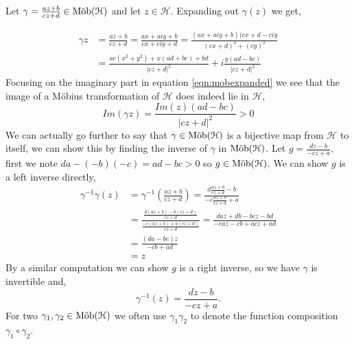 \begin{remark}\label{rem:mobiusExpandBiject}
Let $ \gamma = \frac{az + b}{cz +d} \in \text{M{\"o}b}(\mathcal{H})$ and let $z \in \mathcal{H}$. 
Expanding out $\gamma(z)$ we get, 

\begin{equation}\label{eqn:mobexpanded}
\begin{split}
\gamma z &=  \frac{az +b}{cz+d}   =  \frac{ax + aiy + b}{cx + ciy + d}  =  \frac{(ax+aiy + b)(cx +d - ciy}{{(cx+d)}^2 + {(cy)}^2} \\ 
						& = \frac{ac(x^2 + y^2) + x(ad+bc) + bd}{{|cz+d|}^2} + i\frac{y(ad-bc)}{{|cz+d|}^2}
\end{split}
\end{equation}
Focusing on the imaginary part in equation \ref{eqn:mobexpanded} we see that the image of a Möbius transformation of $\mathcal{H}$ does indeed lie in $\mathcal{H}$,
\begin{equation}\label{eqn:imaginaryMobius}
Im(\gamma z) = \frac{Im(z)(ad-bc)}{{|cz+d|}^2} > 0
\end{equation}
We can actually go further to say that $\gamma \in \text{M{\"o}b}(\mathcal{H})$ is a bijective map from $\mathcal{H}$ to itself, we can show this by finding the inverse of $\gamma$ in $\text{M{\"o}b}(\mathcal{H})$.  Let $g= \frac{dz - b }{-cz + a}$, first we note $da - (-b)(-c) = ad - bc > 0$ so $g \in \text{M{\"o}b}(\mathcal{H})$. We can show $g$ is a left inverse directly,
\begin{align*}
\gamma^{-1}\gamma(z) &= \gamma^{-1}(\frac{az +b}{cz+d}) = \frac{d\frac{az +b}{cz+d} -b}{-c \frac{az +b}{cz+d} + a} \\
& = \frac{ \frac{d(az +b) - b(cz + d)}{cz + d}}{\frac{-c(az +b) + a(cz +d)}{cz+d}} = \frac{ daz +db - bcz -bd}{-caz -cb + acz +ad} \\
& = \frac{(da - bc)z}{-cb  +ad} \\
& = z
\end{align*}
By a similar computation we can show $g$ is a right inverse, so we have $\gamma$ is invertible and, 
\begin{equation}
\gamma^{-1}(z) = \frac{dz - b }{-cz + a}.
\end{equation}
For two $\gamma_1 , \gamma_2 \in \text{M{\"o}b}(\mathcal{H})$ we often use $\gamma_1 \gamma_2$ to denote the function composition $\gamma_1 \circ \gamma_2$.
\end{remark}

